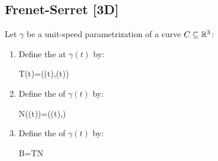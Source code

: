 \documentclass[13pt]{extarticle}
\begin{document}
\subsection{Frenet-Serret [3D]}
Let $\gamma$ be a unit-speed parametrization of a curve $C\subseteq\mathbb{R}^3$: \begin{enumerate}
    \item Define the  at $\gamma(t)$ by: \begin{eqnbox}
        T(t)=(\gamma(t),\dot\gamma(t))
    \end{eqnbox}
    \item Define the  of $\gamma(t)$ by: \begin{eqnbox}
        N(\gamma(t))=\left(\gamma(t),\right)
    \end{eqnbox}
    \item Define the  of $\gamma(t)$ by: \begin{eqnbox}
        B=T\times N
    \end{eqnbox}
\end{enumerate}
\end{document}
